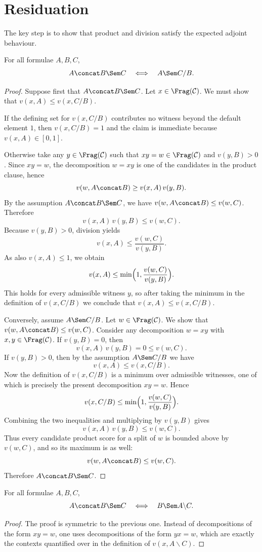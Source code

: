 \section{Residuation}
The key step is to show that product and division satisfy the expected adjoint behaviour.

\begin{proposition}
For all formulae $A,B,C$,
\[
A\concat B \Sem C
\quad\Longleftrightarrow\quad
A \Sem C/B.
\]
\end{proposition}

\begin{proof}
Suppose first that $A\concat B \Sem C$. Let $x \in \Frag(\mathcal C)$. We must show that
$v(x,A) \leq v(x,C/B)$.

If the defining set for $v(x,C/B)$ contributes no witness beyond the default element $1$, then
$v(x,C/B)=1$ and the claim is immediate because $v(x,A) \in [0,1]$.

Otherwise take any $y \in \Frag(\mathcal C)$ such that $xy=w \in \Frag(\mathcal C)$ and
$v(y,B)>0$. Since $xy=w$, the decomposition $w=xy$ is one of the candidates in the product
clause, hence
\[
v(w,A\concat B) \geq v(x,A)\,v(y,B).
\]
By the assumption $A\concat B \Sem C$, we have $v(w,A\concat B) \leq v(w,C)$. Therefore
\[
v(x,A)\,v(y,B) \leq v(w,C).
\]
Because $v(y,B)>0$, division yields
\[
v(x,A) \leq \frac{v(w,C)}{v(y,B)}.
\]
As also $v(x,A)\leq 1$, we obtain
\[
v(x,A) \leq \min\Bigl(1,\frac{v(w,C)}{v(y,B)}\Bigr).
\]
This holds for every admissible witness $y$, so after taking the minimum in the definition of
$v(x,C/B)$ we conclude that $v(x,A) \leq v(x,C/B)$.

Conversely, assume $A \Sem C/B$. Let $w \in \Frag(\mathcal C)$. We show that
$v(w,A\concat B) \leq v(w,C)$. Consider any decomposition $w=xy$ with $x,y \in \Frag(\mathcal C)$.
If $v(y,B)=0$, then
\[
v(x,A)\,v(y,B)=0 \leq v(w,C).
\]
If $v(y,B)>0$, then by the assumption $A \Sem C/B$ we have
\[
v(x,A) \leq v(x,C/B).
\]
Now the definition of $v(x,C/B)$ is a minimum over admissible witnesses, one of which is
precisely the present decomposition $xy=w$. Hence
\[
v(x,C/B) \leq \min\Bigl(1,\frac{v(w,C)}{v(y,B)}\Bigr).
\]
Combining the two inequalities and multiplying by $v(y,B)$ gives
\[
v(x,A)\,v(y,B) \leq v(w,C).
\]
Thus every candidate product score for a split of $w$ is bounded above by $v(w,C)$, and so
its maximum is as well:
\[
v(w,A\concat B) \leq v(w,C).
\]
Therefore $A\concat B \Sem C$.
\end{proof}

\begin{proposition}
For all formulae $A,B,C$,
\[
A\concat B \Sem C
\quad\Longleftrightarrow\quad
B \Sem A\backslash C.
\]
\end{proposition}

\begin{proof}
The proof is symmetric to the previous one. Instead of decompositions of the form $xy=w$, one
uses decompositions of the form $yx=w$, which are exactly the contexts quantified over in the
definition of $v(x,A\backslash C)$.
\end{proof}

